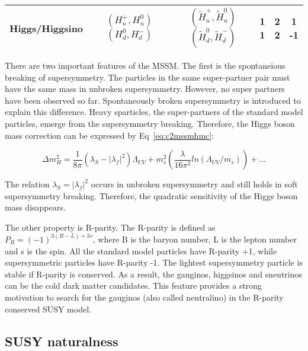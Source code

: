\begin{table}[htbp]
\begin{centering}
\begin{tabular}{|c|c|c|c|c|c|}
\hline
Higgs/Higgsino   & \specialcell{$(H_{u}^{+},H_{u}^{0})$ \\ $(H_{d}^{0},H_{d}^{-})$} & \specialcell{$(\tilde{H}_{u}^{+},\tilde{H}_{u}^{0})$ \\ $(\tilde{H}_{d}^{0},\tilde{H}_{d}^{-})$} & \specialcell{1 \\ 1} & \specialcell{2 \\ 2} & \specialcell{1 \\ -1} \\
\hline
\end{tabular}
\par\end{centering}
\end{table}

There are two important features of the MSSM. The first is the spontaneious breaking of supersymmetry. The particles in the same super-partner pair must have the same mass in unbroken supersymmetry. However, no super partners have been observed so far. Spontaneously broken supersymmetry is introduced to explain this difference. Heavy sparticles, the super-partners of the standard model particles, emerge from the supersymmetry breaking. Therefore, the Higgs boson mass correction can be expressed by Eq~\ref{eq:c2mssmhmc}:

\begin{equation}
 \Delta m_{H}^{2} = \frac{1}{8\pi}(\lambda_{S}-|\lambda_{f}|^{2})\Lambda_{UV}+m_{s}^{2}(\frac{\lambda}{16\pi^{2}}ln(\Lambda_{UV}/m_{s}))+...
 \label{eq:c2mssmhmc}
\end{equation}

The relation $\lambda_{S}=|\lambda_{f}|^{2}$ occurs in unbroken supersymmetry and still holds in soft supersymmetry breaking\cite{Martin:1997ns}. Therefore, the quadratic sensitivity of the Higgs boson mass disappears.

The other property is R-parity. The R-parity is defined as $P_{R}=(-1)^{3(B-L)+3s}$, where B is the baryon number, L is the lepton number and s is the spin. All the standard model particles have R-parity +1, while supersymmetric particles have R-parity -1. The lightest supersymmetry particle is stable if R-parity is conserved. As a result, the gauginos, higgsinos and sneutrinos can be the cold dark matter candidates. This feature provides a strong motivation to search for the gauginos (also called neutralino) in the R-parity conserved SUSY model. 

\clearpage
\subsection{SUSY naturalness}

